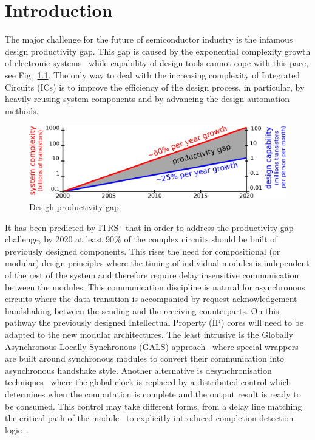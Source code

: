 
\chapter{Introduction}

The major challenge for the future of semiconductor industry is the infamous design productivity gap. This gap is caused by the exponential complexity growth of electronic systems~\cite{Moore_1965_e}  while capability of design tools cannot cope with this pace, see Fig.~\ref{fig:productivity_gap}. The only way to deal with the increasing complexity of Integrated Circuits (ICs) is to improve the efficiency of the design process, in particular, by heavily reusing system components and by advancing the design automation methods.

\begin{figure}
\centering
  \includegraphics[scale=0.5]{fig/figs/productivity_gap}
  \caption{
    \label{fig:productivity_gap}
    Desigh productivity gap}
\end{figure}


It has been predicted by ITRS~\cite{ITRS_2011} that in order to address the productivity gap challenge, by 2020 at least 90\% of the complex circuits should be built of previously designed components. This rises the need for compositional (or modular) design principles where the timing of individual modules is independent of the rest of the system and  therefore require delay insensitive communication between the modules. This communication discipline is natural for asynchronous circuits where the data transition is accompanied by request-acknowledgement handshaking between the sending and the receiving counterparts. On this pathway the previously designed Intellectual Property (IP) cores will need to be adapted to the new modular architectures. The least intrusive is the Globally Asynchronous Locally Synchronous (GALS) approach~\cite{Chapiro_1984_phd} where special wrappers~\cite{Mullins_2007_async, Fan_2009_iccd} are built around synchronous modules to convert their communication into asynchronous handshake style. Another alternative is desynchronisation techniques~\cite{Cortadella_2006_ieeetcad} where the global clock is replaced by a distributed control which determines when the computation is complete and the output result is ready to be consumed. This control may take different forms, from a delay line matching the critical path of the module~\cite{Cortadella_2010_icicdt} to explicitly introduced completion detection logic~\cite{Kondratyev_2002_ieeedtc}.

